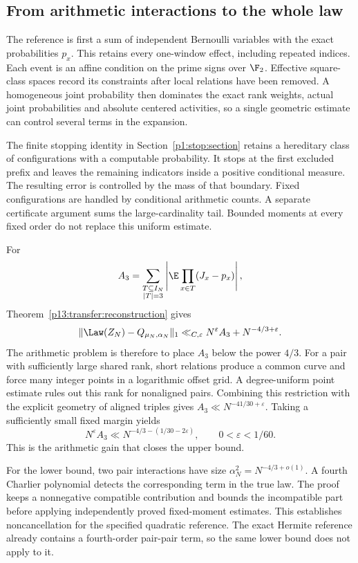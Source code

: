 \subsection{From arithmetic interactions to the whole law}
\label{p1:intro:strategy}
\label{p1:intro:dependencies}

The reference is first a sum of independent Bernoulli variables with
the exact probabilities \(p_x\). This retains every one-window effect,
including repeated indices. Each event is an affine condition on the
prime signs over \(\F_2\). Effective square-class spaces record its
constraints after local relations have been removed. A homogeneous
joint probability then dominates the exact rank weights, actual joint
probabilities and absolute centered activities, so a single geometric
estimate can control several terms in the expansion.

The finite stopping identity in Section~\ref{p1:stop:section} retains
a hereditary class of configurations with a computable probability.
It stops at the first excluded prefix and leaves the remaining
indicators inside a positive conditional measure. The resulting error
is controlled by the mass of that boundary. Fixed configurations are
handled by conditional arithmetic counts. A separate certificate
argument sums the large-cardinality tail. Bounded moments at every
fixed order do not replace this uniform estimate.

For
\[
 A_3=\sum_{\substack{T\subseteq I_N\\|T|=3}}
       \left|\E\prod_{x\in T}(J_x-p_x)\right|,
\]
Theorem~\ref{p13:transfer:reconstruction} gives
\[
 \|\Law(Z_N)-Q_{\mu_N,\alpha_N}\|_1
       \ll_{C,\varepsilon}N^\varepsilon A_3
                            +N^{-4/3+\varepsilon}.
\]
The arithmetic problem is therefore to place \(A_3\) below the
power \(4/3\). For a pair with sufficiently large shared rank, short
relations produce a common curve and force many integer points in a
logarithmic offset grid. A degree-uniform point estimate rules out this
rank for nonaligned pairs. Combining this restriction
with the explicit geometry of aligned triples gives
\(A_3\ll N^{-41/30+\varepsilon}\).
Taking a sufficiently small fixed margin yields
\[
 N^\varepsilon A_3
   \ll N^{-4/3-(1/30-2\varepsilon)},
 \qquad 0<\varepsilon<1/60.
\]
This is the arithmetic gain that closes the upper bound.

For the lower bound, two pair interactions have size
\(\alpha_N^2=N^{-4/3+o(1)}\). A fourth Charlier polynomial detects
the corresponding term in the true law. The proof keeps a
nonnegative compatible contribution and bounds the incompatible
part before applying independently proved fixed-moment estimates.
This establishes noncancellation for the specified quadratic
reference. The exact Hermite reference already contains a fourth-order
pair-pair term, so the same lower bound does not apply to it.

